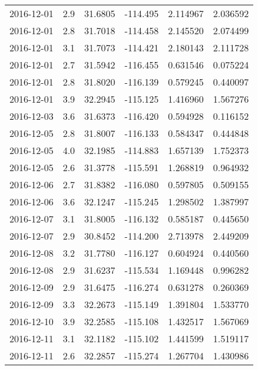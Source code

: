 \begin{tabular}{lrrrrr}
2016-12-01 &       2.9 &  31.6805 &  -114.495 &         2.114967 &         2.036592 \\
2016-12-01 &       2.8 &  31.7018 &  -114.458 &         2.145520 &         2.074499 \\
2016-12-01 &       3.1 &  31.7073 &  -114.421 &         2.180143 &         2.111728 \\
2016-12-01 &       2.7 &  31.5942 &  -116.455 &         0.631546 &         0.075224 \\
2016-12-01 &       2.8 &  31.8020 &  -116.139 &         0.579245 &         0.440097 \\
2016-12-01 &       3.9 &  32.2945 &  -115.125 &         1.416960 &         1.567276 \\
2016-12-03 &       3.6 &  31.6373 &  -116.420 &         0.594928 &         0.116152 \\
2016-12-05 &       2.8 &  31.8007 &  -116.133 &         0.584347 &         0.444848 \\
2016-12-05 &       4.0 &  32.1985 &  -114.883 &         1.657139 &         1.752373 \\
2016-12-05 &       2.6 &  31.3778 &  -115.591 &         1.268819 &         0.964932 \\
2016-12-06 &       2.7 &  31.8382 &  -116.080 &         0.597805 &         0.509155 \\
2016-12-06 &       3.6 &  32.1247 &  -115.245 &         1.298502 &         1.387997 \\
2016-12-07 &       3.1 &  31.8005 &  -116.132 &         0.585187 &         0.445650 \\
2016-12-07 &       2.9 &  30.8452 &  -114.200 &         2.713978 &         2.449209 \\
2016-12-08 &       3.2 &  31.7780 &  -116.127 &         0.604924 &         0.440560 \\
2016-12-08 &       2.9 &  31.6237 &  -115.534 &         1.169448 &         0.996282 \\
2016-12-09 &       2.9 &  31.6475 &  -116.274 &         0.631278 &         0.260369 \\
2016-12-09 &       3.3 &  32.2673 &  -115.149 &         1.391804 &         1.533770 \\
2016-12-10 &       3.9 &  32.2585 &  -115.108 &         1.432517 &         1.567069 \\
2016-12-11 &       3.1 &  32.1182 &  -115.102 &         1.441599 &         1.519117 \\
2016-12-11 &       2.6 &  32.2857 &  -115.274 &         1.267704 &         1.430986 \\

\end{tabular}
